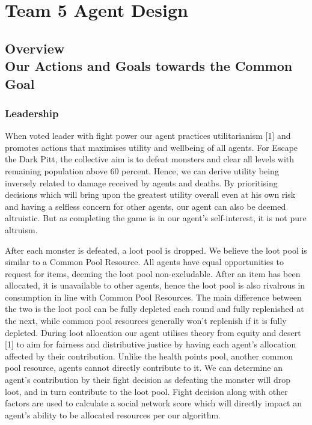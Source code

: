 \chapter{Team 5 Agent Design}\label{team_5_agent_design}

{\section[Overview]{Overview\\ {Our Actions and Goals towards the Common Goal}}}

\subsection{Leadership}
When voted leader with fight power our agent practices utilitarianism [1] and promotes actions that maximises utility and wellbeing of all agents. For Escape the Dark Pitt, the collective aim is to defeat monsters and clear all levels with remaining population above 60 percent. Hence, we can derive utility being inversely related to damage received by agents and deaths. By prioritising decisions which will bring upon the greatest utility overall even at his own risk and having a selfless concern for other agents, our agent can also be deemed altruistic. But as completing the game is in our agent's self-interest, it is not pure altruism.

After each monster is defeated, a loot pool is dropped. We believe the loot pool is similar to a Common Pool Resource. All agents have equal opportunities to request for items, deeming the loot pool non-excludable. After an item has been allocated, it is unavailable to other agents, hence the loot pool is also rivalrous in consumption in line with Common Pool Resources. The main difference between the two is the loot pool can be fully depleted each round and fully replenished at the next, while common pool resources generally won't replenish if it is fully depleted. During loot allocation our agent utilises theory from equity and desert [1] to aim for fairness and distributive justice by having each agent's allocation affected by their contribution. Unlike the health points pool, another common pool resource, agents cannot directly contribute to it. We can determine an agent's contribution by their fight decision as defeating the monster will drop loot, and in turn contribute to the loot pool. Fight decision along with other factors are used to calculate a social network score which will directly impact an agent's ability to be allocated resources per our algorithm.

